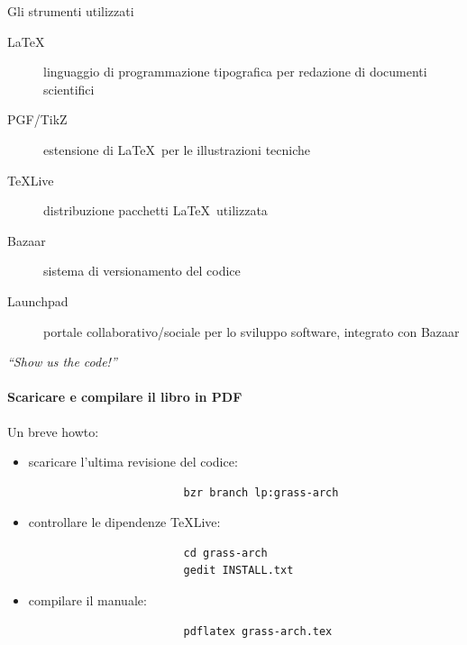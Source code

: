 \documentclass[xcolor=svgnames]{beamer}
\begin{document}
		\begin{frame}{Gli strumenti utilizzati}
			\begin{description}
				\item[\LaTeX]linguaggio di programmazione tipografica per redazione di documenti scientifici
				\item[PGF/TikZ]estensione di \LaTeX~per le illustrazioni tecniche
				\item[\TeX Live]distribuzione pacchetti \LaTeX~utilizzata
				\item[Bazaar]sistema di versionamento del codice
				\item[Launchpad]portale collaborativo/sociale per lo sviluppo software, integrato con Bazaar
			\end{description}
		\end{frame}


		\begin{frame}[fragile]{\emph{``Show us the code!''}}
			\framesubtitle{Scaricare e compilare il libro in PDF}
			Un breve howto:
			\begin{itemize}
				\item scaricare l'ultima revisione del codice:
					\begin{lstlisting}
						bzr branch lp:grass-arch
					\end{lstlisting}
				\item controllare le dipendenze \TeX Live:
					\begin{lstlisting}
						cd grass-arch
						gedit INSTALL.txt
					\end{lstlisting}
				\item compilare il manuale: 
					\begin{lstlisting}
						pdflatex grass-arch.tex
					\end{lstlisting}
			\end{itemize}
		\end{frame}

\end{document}
